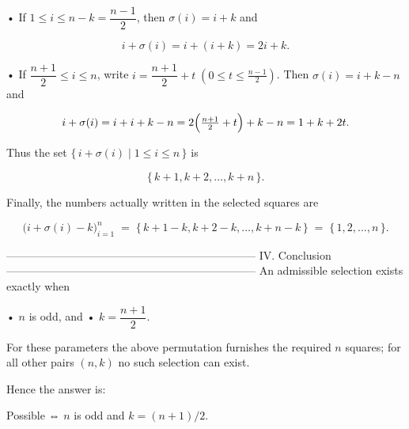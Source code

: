 •  If \(1\le i\le n-k=\dfrac{n-1}{2}\),
   then \(\sigma(i)=i+k\) and  

   \[
   i+\sigma(i)=i+(i+k)=2i+k.
   \]

•  If \(\dfrac{n+1}{2}\le i\le n\),
   write \(i=\dfrac{n+1}{2}+t\;(0\le t\le \tfrac{n-1}{2})\).
   Then \(\sigma(i)=i+k-n\) and  

   \[
   i+\sigma(i)=i+i+k-n
              =2\Bigl(\tfrac{n+1}{2}+t\Bigr)+k-n
              =1+k+2t.
   \]

Thus the set \(\{\,i+\sigma(i)\mid1\le i\le n\,\}\) is

\[
\{\,k+1,k+2,\dots ,k+n\,\}.
\]

Finally, the numbers actually written in the selected squares are

\[
\bigl(i+\sigma(i)-k\bigr)_{i=1}^{n}
  \;=\;\{\,k+1-k,k+2-k,\dots ,k+n-k\,\}
  \;=\;\{\,1,2,\dots ,n\,\}.
\]

--------------------------------------------------------------------
IV.  Conclusion
--------------------------------------------------------------------
An admissible selection exists
exactly when

•  \(n\) is odd, and  
•  \(k=\dfrac{n+1}{2}\).

For these parameters the above permutation furnishes the required
\(n\) squares; for all other pairs \((n,k)\) no such selection can
exist.

Hence the answer is:

Possible ⇔ \(n\) is odd and \(k=(n+1)/2\).
